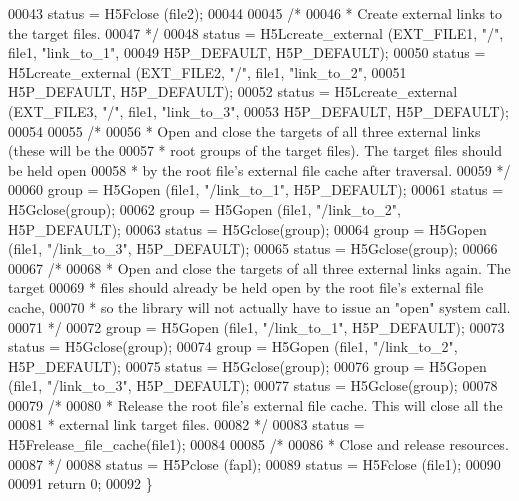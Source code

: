 \begin{DoxyCode}
00043     status = H5Fclose (file2);
00044 
00045     \textcolor{comment}{/*}
00046 \textcolor{comment}{     * Create external links to the target files.}
00047 \textcolor{comment}{     */}
00048     status = H5Lcreate\_external (EXT\_FILE1, \textcolor{stringliteral}{"/"}, file1, \textcolor{stringliteral}{"link\_to\_1"},
00049             H5P\_DEFAULT, H5P\_DEFAULT);
00050     status = H5Lcreate\_external (EXT\_FILE2, \textcolor{stringliteral}{"/"}, file1, \textcolor{stringliteral}{"link\_to\_2"},
00051             H5P\_DEFAULT, H5P\_DEFAULT);
00052     status = H5Lcreate\_external (EXT\_FILE3, \textcolor{stringliteral}{"/"}, file1, \textcolor{stringliteral}{"link\_to\_3"},
00053             H5P\_DEFAULT, H5P\_DEFAULT);
00054 
00055     \textcolor{comment}{/*}
00056 \textcolor{comment}{     * Open and close the targets of all three external links (these will be the}
00057 \textcolor{comment}{     * root groups of the target files).  The target files should be held open}
00058 \textcolor{comment}{     * by the root file's external file cache after traversal.}
00059 \textcolor{comment}{     */}
00060     group = H5Gopen (file1, \textcolor{stringliteral}{"/link\_to\_1"}, H5P\_DEFAULT);
00061     status = H5Gclose(group);
00062     group = H5Gopen (file1, \textcolor{stringliteral}{"/link\_to\_2"}, H5P\_DEFAULT);
00063     status = H5Gclose(group);
00064     group = H5Gopen (file1, \textcolor{stringliteral}{"/link\_to\_3"}, H5P\_DEFAULT);
00065     status = H5Gclose(group);
00066 
00067     \textcolor{comment}{/*}
00068 \textcolor{comment}{     * Open and close the targets of all three external links again.  The target}
00069 \textcolor{comment}{     * files should already be held open by the root file's external file cache,}
00070 \textcolor{comment}{     * so the library will not actually have to issue an "open" system call.}
00071 \textcolor{comment}{     */}
00072     group = H5Gopen (file1, \textcolor{stringliteral}{"/link\_to\_1"}, H5P\_DEFAULT);
00073     status = H5Gclose(group);
00074     group = H5Gopen (file1, \textcolor{stringliteral}{"/link\_to\_2"}, H5P\_DEFAULT);
00075     status = H5Gclose(group);
00076     group = H5Gopen (file1, \textcolor{stringliteral}{"/link\_to\_3"}, H5P\_DEFAULT);
00077     status = H5Gclose(group);
00078 
00079     \textcolor{comment}{/*}
00080 \textcolor{comment}{     * Release the root file's external file cache.  This will close all the}
00081 \textcolor{comment}{     * external link target files.}
00082 \textcolor{comment}{     */}
00083     status = H5Frelease\_file\_cache(file1);
00084 
00085     \textcolor{comment}{/*}
00086 \textcolor{comment}{     * Close and release resources.}
00087 \textcolor{comment}{     */}
00088     status = H5Pclose (fapl);
00089     status = H5Fclose (file1);
00090 
00091     \textcolor{keywordflow}{return} 0;
00092 \}
\end{DoxyCode}
